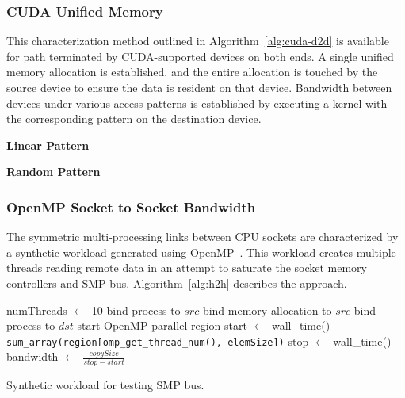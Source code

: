 
\subsubsection{CUDA Unified Memory}

This characterization method outlined in Algorithm~\ref{alg:cuda-d2d} is available for path terminated by CUDA-supported devices on both ends.
A single unified memory allocation is established, and the entire allocation is touched by the source device to ensure the data is resident on that device.
Bandwidth between devices under various access patterns is established by executing a kernel with the corresponding pattern on the destination device.

\textbf{Linear Pattern}


\textbf{Random Pattern}



\subsubsection{OpenMP Socket to Socket Bandwidth}

The symmetric multi-processing links between CPU sockets are characterized by a synthetic workload generated using OpenMP~\cite{openmp2013}.
This workload creates multiple threads reading remote data in an attempt to saturate the socket memory controllers and SMP bus.
Algorithm~\ref{alg:h2h} describes the approach.

\begin{algorithm}[ht]
    \SetAlgoLined
    numThreads $\gets$ 10\;
    \;
     {
        bind process to $src$\;
        bind memory allocation to $src$\;
        bind process to $dst$\;
        start OpenMP parallel region\;
        start $\gets$ wall\_time()\;
        \texttt{sum\_array(region[omp\_get\_thread\_num(), elemSize])}\;
        stop $\gets$ wall\_time()\;
        bandwidth $\gets$ $\frac{copySize}{stop - start}$\;
    }
    \caption{Synthetic workload for testing SMP bus.}
    \label{alg:h2h}
\end{algorithm}

